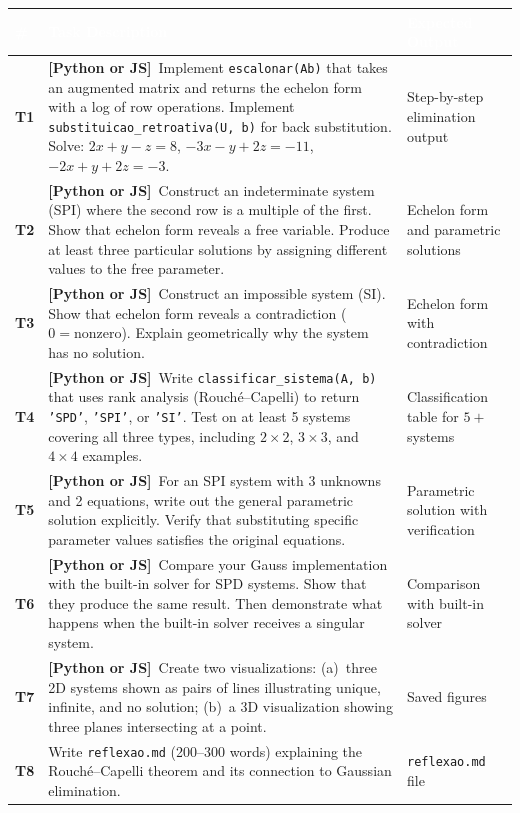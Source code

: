 \documentclass[a4paper,11pt]{article}
\newcommand{\bothlabel}{\textcolor{ippblue}{\textbf{[Python or JS]}}}
\begin{document}
\renewcommand{\arraystretch}{1.3}
\begin{tabularx}{\textwidth}{
  >{\centering\bfseries\cellcolor{lightblue}}p{0.8cm}
  X
  p{3.5cm}
}
\toprule
\rowcolor{ippblue}
\textcolor{white}{\#} & \textcolor{white}{\textbf{Task Description}} & \textcolor{white}{\textbf{Expected Output}} \\
\midrule
T1 & \bothlabel\ Implement \texttt{escalonar(Ab)} that takes an augmented matrix and returns the echelon form with a log of row operations. Implement \texttt{substituicao\_retroativa(U, b)} for back substitution. Solve: $2x + y - z = 8$, $-3x - y + 2z = -11$, $-2x + y + 2z = -3$. & Step-by-step elimination output \\
\rowcolor{lightgray}
T2 & \bothlabel\ Construct an indeterminate system (SPI) where the second row is a multiple of the first. Show that echelon form reveals a free variable. Produce at least three particular solutions by assigning different values to the free parameter. & Echelon form and parametric solutions \\
T3 & \bothlabel\ Construct an impossible system (SI). Show that echelon form reveals a contradiction ($0 = \text{nonzero}$). Explain geometrically why the system has no solution. & Echelon form with contradiction \\
\rowcolor{lightgray}
T4 & \bothlabel\ Write \texttt{classificar\_sistema(A, b)} that uses rank analysis (Rouch\'e--Capelli) to return \texttt{'SPD'}, \texttt{'SPI'}, or \texttt{'SI'}. Test on at least 5 systems covering all three types, including $2 \times 2$, $3 \times 3$, and $4 \times 4$ examples. & Classification table for $5+$ systems \\
T5 & \bothlabel\ For an SPI system with 3 unknowns and 2 equations, write out the general parametric solution explicitly. Verify that substituting specific parameter values satisfies the original equations. & Parametric solution with verification \\
\rowcolor{lightgray}
T6 & \bothlabel\ Compare your Gauss implementation with the built-in solver for SPD systems. Show that they produce the same result. Then demonstrate what happens when the built-in solver receives a singular system. & Comparison with built-in solver \\
T7 & \bothlabel\ Create two visualizations: (a)~three 2D systems shown as pairs of lines illustrating unique, infinite, and no solution; (b)~a 3D visualization showing three planes intersecting at a point. & Saved figures \\
\rowcolor{lightgray}
T8 & Write \texttt{reflexao.md} (200--300 words) explaining the Rouch\'e--Capelli theorem and its connection to Gaussian elimination. & \texttt{reflexao.md} file \\
\bottomrule
\end{tabularx}
\end{document}
